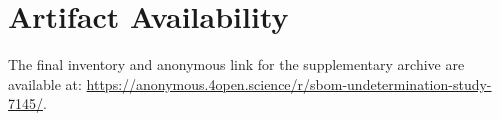 \section*{Artifact Availability}
The final inventory and anonymous link for the supplementary archive are available at: \url{https://anonymous.4open.science/r/sbom-undetermination-study-7145/}.
